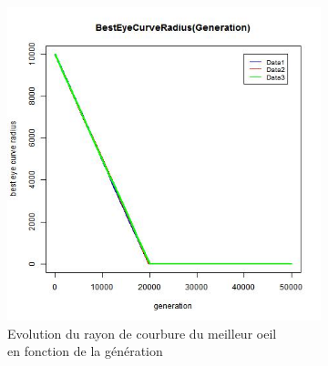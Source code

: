 \documentclass[a4paper,11pt]{article}
\begin{document}


\begin{figure}
\centering
\begin{subfigure}{.5\textwidth}
  \centering
\includegraphics[width=1\linewidth]{best_eye_curve_radius.jpeg}
\caption{Evolution du rayon de courbure du meilleur oeil \\en fonction de la génération}
\label{fig:modelisation}
\end{subfigure}%
\begin{subfigure}{.5\textwidth}
  \centering

\end{subfigure}
\end{figure}
\end{document}
